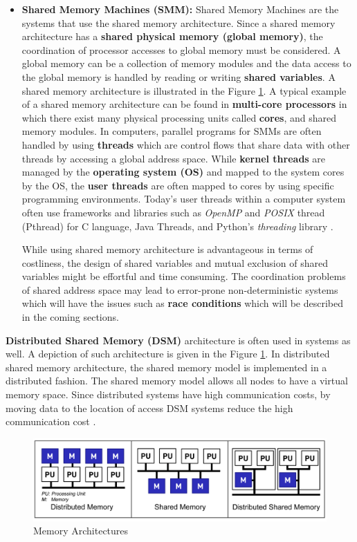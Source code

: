 \begin{itemize}
	\item \textbf{Shared Memory Machines (SMM):} Shared Memory Machines are the systems that use the shared memory architecture. Since a shared memory architecture has a \textbf{shared physical memory (global memory)}, the coordination of processor accesses to global memory must be considered. A global memory can be a collection of memory modules and the data access to the global memory is handled by reading or writing \textbf{shared variables}. A shared memory architecture is illustrated in the Figure \ref{fig:memarch}. A typical example of a shared memory architecture can be found in \textbf{multi-core processors} in which there exist many physical processing units called \textbf{cores}, and shared memory modules. In computers, parallel programs for SMMs are often handled by using \textbf{threads} which are control flows that share data with other threads by accessing a global address space. While \textbf{kernel threads} are managed by the \textbf{operating system (OS)} and mapped to the system cores by the OS, the \textbf{user threads} are often mapped to cores by using specific programming environments. Today's user threads within a computer system often use frameworks and libraries such as \textit{OpenMP} and \textit{POSIX} thread (Pthread) for C language, Java Threads, and Python's \textit{threading} library \cite{springerparallel}. 
	
	While using shared memory architecture is advantageous in terms of costliness, the design of shared variables and mutual exclusion of shared variables might be effortful and time consuming. The coordination problems of shared address space may lead to error-prone non-deterministic systems which will have the issues such as \textbf{race conditions} which will be described in the coming sections. 
\end{itemize}
\textbf{Distributed Shared Memory (DSM)} architecture is often used in systems as well. A depiction of such architecture is given in the Figure \ref{fig:memarch}. In distributed shared memory architecture, the shared memory model is implemented in a distributed fashion. The shared memory model allows all nodes to have a virtual memory space. Since distributed systems have high communication costs, by moving data to the location of access DSM systems reduce the high communication cost \cite{dsm}. 
\begin{figure}[!ht]
	\centering
	\captionsetup{justification=centering}
	\includegraphics[width=\textwidth]{content/images/memarch.png}
	\caption{Memory Architectures \cite{lukas1}}
	\label{fig:memarch}
\end{figure}

